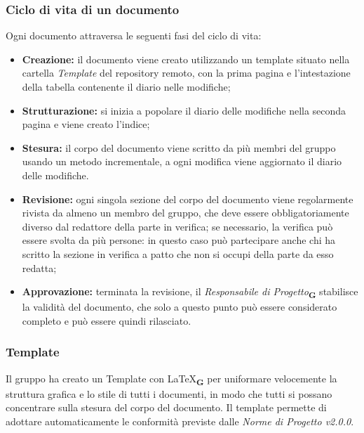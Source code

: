 \subsubsection{Ciclo di vita di un documento}
Ogni documento attraversa le seguenti fasi del ciclo di vita:
\begin{itemize}
    \item \textbf{Creazione:} il documento viene creato utilizzando un template situato nella cartella \textit{Template} del repository remoto, con la prima pagina e l'intestazione della tabella contenente il diario nelle modifiche;
    \item \textbf{Strutturazione:} si inizia a popolare il diario delle modifiche nella seconda pagina e viene creato l'indice;
    \item \textbf{Stesura:} il corpo del documento viene scritto da più membri del gruppo usando un metodo incrementale, a ogni modifica viene aggiornato il diario delle modifiche.
    \item \textbf{Revisione:} ogni singola sezione del corpo del documento viene regolarmente rivista da almeno un membro del gruppo, che deve essere obbligatoriamente diverso dal redattore della parte in verifica; se necessario, la verifica può essere svolta da più persone: in questo caso può partecipare anche chi ha scritto la sezione in verifica a patto che non si occupi della parte da esso redatta;
    \item \textbf{Approvazione:} terminata la revisione, il \textit{Responsabile di Progetto}\textsubscript{\textbf{G}} stabilisce la validità del documento, che solo a questo punto può essere considerato completo e può essere quindi rilasciato.
\end{itemize}
\subsubsection{Template}
Il gruppo ha creato un Template con \LaTeX\textsubscript{\textbf{G}} per uniformare velocemente la struttura grafica e lo stile di tutti i documenti, in modo che tutti si possano concentrare sulla stesura del corpo del documento. Il template permette di adottare automaticamente le conformità previste dalle \textit{Norme di Progetto v2.0.0}.
